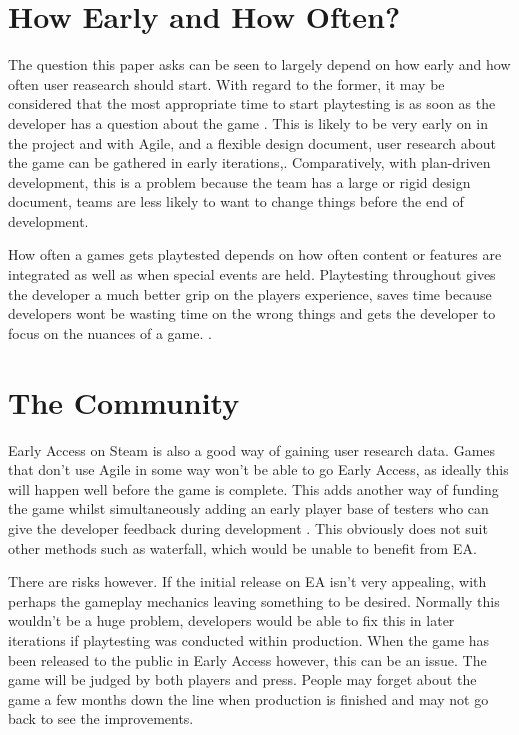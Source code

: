 \documentclass{scrartcl}
\begin{document}
\section{How Early and How Often?}

The question this paper asks can be seen to largely depend on how early and how often user reasearch should start. With regard to the former, it may be considered that the most appropriate time to start playtesting is as soon as the developer has a question about the game \cite{GDCSharks:14}. This is likely to be very early on in the project and with Agile, and a flexible design document, user research about the game can be gathered in early iterations,. Comparatively, with plan-driven development, this is a problem because the team has a large or rigid design document, teams are less likely to want to change things before the end of development. \par
How often a games gets playtested depends on how often content or features are integrated as well as when special events are held. Playtesting throughout gives the developer a much better grip on the players experience, saves time because developers wont be wasting time on the wrong things and gets the developer to focus on the nuances of a game. \cite{GDCAED:15}.


\section{The Community}

Early Access on Steam is also a good way of gaining user research data\cite{GamesEA:16}. 
Games that don't use Agile in some way won't be able to go Early Access, as ideally this will happen well before the game is complete. This adds another way of funding the game whilst simultaneously adding an early player base of testers who can give the developer feedback during development \cite{GDCOTC:5}. This obviously does not suit other methods such as waterfall, which would be unable to benefit from EA. \par
There are risks however. If the initial release on EA isn't very appealing, with perhaps the gameplay mechanics leaving something to be desired. Normally this wouldn't be a huge problem, developers would be able to fix this in later iterations if playtesting was conducted within production. When the game has been released to the public in Early Access however, this can be an issue. The game will be judged by both players and press. People may forget about the game a few months down the line when production is finished and may not go back to see the improvements.
\end{document}
